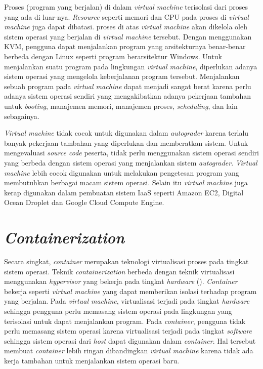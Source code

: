 \par Proses (program yang berjalan) di dalam \textit{virtual machine} terisolasi dari proses yang ada di luar-nya. \textit{Resource} seperti memori dan CPU pada proses di \textit{virtual machine} juga dapat dibatasi. proses di atas \textit{virtual machine} akan dikelola oleh sistem operasi yang berjalan di \textit{virtual machine} tersebut. Dengan menggunakan KVM, pengguna dapat menjalankan program yang arsitekturnya benar-benar berbeda dengan Linux seperti program berarsitektur Windows. Untuk menjalankan suatu program pada lingkungan \textit{virtual machine}, diperlukan adanya sistem operasi yang mengelola keberjalanan program tersebut. Menjalankan sebuah program pada \textit{virtual machine} dapat menjadi sangat berat karena perlu adanya sistem operasi sendiri yang mengakibatkan adanya pekerjaan tambahan untuk \textit{booting}, manajemen memori, manajemen proses, \textit{scheduling}, dan lain sebagainya.

\par \textit{Virtual machine} tidak cocok untuk digunakan dalam \textit{autograder} karena terlalu banyak pekerjaan tambahan yang diperlukan dan memberatkan sistem. Untuk mengevaluasi \textit{source code} peserta, tidak perlu menggunakan sistem operasi sendiri yang berbeda dengan sistem operasi yang menjalankan sistem \textit{autograder}. \textit{Virtual machine} lebih cocok digunakan untuk melakukan pengetesan program yang membutuhkan berbagai macam sistem operasi. Selain itu \textit{virtual machine} juga kerap digunakan dalam pembuatan sistem IaaS seperti Amazon EC2, Digital Ocean Droplet dan Google Cloud Compute Engine.

\section{\textit{Containerization}}


\par Secara singkat, \textit{container} merupakan teknologi virtualisasi proses pada tingkat sistem operasi. Teknik \textit{containerization} berbeda dengan teknik virtualisasi menggunakan \textit{hypervisor} yang bekerja pada tingkat \textit{hardware} (\cite{merkeldocker}). \textit{Container} bekerja seperti \textit{virtual machine} yang dapat memberikan isolasi terhadap program yang berjalan. Pada \textit{virtual machine}, virtualisasi terjadi pada tingkat \textit{hardware} sehingga pengguna perlu memasang sistem operasi pada lingkungan yang terisolasi untuk dapat menjalankan program. Pada \textit{container}, pengguna tidak perlu memasang sistem operasi karena virtualisasi terjadi pada tingkat \textit{software} sehingga sistem operasi dari \textit{host} dapat digunakan dalam \textit{container}. Hal tersebut membuat \textit{container} lebih ringan dibandingkan \textit{virtual machine} karena tidak ada kerja tambahan untuk menjalankan sistem operasi baru.

